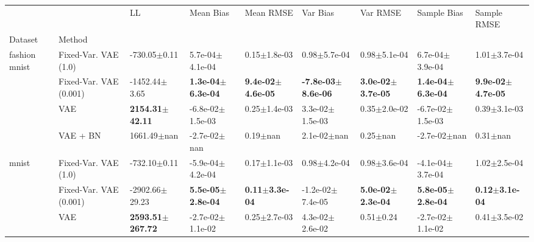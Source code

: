 \begin{tabular}{lllllllll}
\toprule
             &                        &                           LL &                     Mean Bias &                     Mean RMSE &                       Var Bias &                      Var RMSE &                   Sample Bias &                   Sample RMSE \\
Dataset & Method &                              &                               &                               &                                &                               &                               &                               \\
\midrule
fashion mnist & Fixed-Var. VAE (1.0) &             -730.05$\pm$0.11 &           5.7e-04$\pm$4.1e-04 &              0.15$\pm$1.8e-03 &               0.98$\pm$5.7e-04 &              0.98$\pm$5.1e-04 &           6.7e-04$\pm$3.9e-04 &              1.01$\pm$3.7e-04 \\
             & Fixed-Var. VAE (0.001) &            -1452.44$\pm$3.65 &  \textbf{1.3e-04$\pm$6.3e-04} &  \textbf{9.4e-02$\pm$4.6e-05} &  \textbf{-7.8e-03$\pm$8.6e-06} &  \textbf{3.0e-02$\pm$3.7e-05} &  \textbf{1.4e-04$\pm$6.3e-04} &  \textbf{9.9e-02$\pm$4.7e-05} \\
             & VAE &   \textbf{2154.31$\pm$42.11} &          -6.8e-02$\pm$1.5e-03 &              0.25$\pm$1.4e-03 &            3.3e-02$\pm$1.5e-03 &              0.35$\pm$2.0e-02 &          -6.7e-02$\pm$1.5e-03 &              0.39$\pm$3.1e-03 \\
             & VAE + BN &              1661.49$\pm$nan &              -2.7e-02$\pm$nan &                  0.19$\pm$nan &                2.1e-02$\pm$nan &                  0.25$\pm$nan &              -2.7e-02$\pm$nan &                  0.31$\pm$nan \\
mnist & Fixed-Var. VAE (1.0) &             -732.10$\pm$0.11 &          -5.9e-04$\pm$4.2e-04 &              0.17$\pm$1.1e-03 &               0.98$\pm$4.2e-04 &              0.98$\pm$3.6e-04 &          -4.1e-04$\pm$3.7e-04 &              1.02$\pm$2.5e-04 \\
             & Fixed-Var. VAE (0.001) &           -2902.66$\pm$29.23 &  \textbf{5.5e-05$\pm$2.8e-04} &     \textbf{0.11$\pm$3.3e-04} &           -1.2e-02$\pm$7.4e-05 &  \textbf{5.0e-02$\pm$2.3e-04} &  \textbf{5.8e-05$\pm$2.8e-04} &     \textbf{0.12$\pm$3.1e-04} \\
             & VAE &  \textbf{2593.51$\pm$267.72} &          -2.7e-02$\pm$1.1e-02 &              0.25$\pm$2.7e-03 &            4.3e-02$\pm$2.6e-02 &                 0.51$\pm$0.24 &          -2.7e-02$\pm$1.1e-02 &              0.41$\pm$3.5e-02 \\

\end{tabular}
